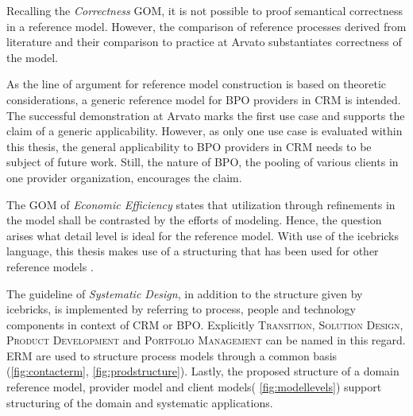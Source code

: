 	Recalling the \textit{Correctness} \acrshort{GOM}, it is not possible to proof semantical correctness in a reference model. However, the comparison of reference processes derived from literature and their comparison to practice at Arvato substantiates correctness of the model. 
	
As the line of argument for reference model construction is based on theoretic considerations, a generic reference model for BPO providers in CRM is intended. The successful demonstration at Arvato marks the first use case and supports the claim of a generic applicability. However, as only one use case is evaluated within this thesis, the general applicability to BPO providers in CRM needs to be subject of future work. Still, the nature of BPO, \ie the pooling of various clients in one provider organization, encourages the claim. 

The \acrshort{GOM} of \textit{Economic Efficiency} states that utilization through refinements in the model shall be contrasted by the efforts of modeling. Hence, the question arises what detail level is ideal for the reference model. With use of the icebricks language, this thesis makes use of a structuring that has been used for other reference models \citep{Puster2015, 9783832540920}. 

The guideline of \textit{Systematic Design}, in addition to the structure given by icebricks, is implemented by referring to process, people and technology components in context of CRM or BPO. Explicitly \textsc{Transition}, \textsc{Solution Design}, \textsc{Product Development}  and \textsc{Portfolio Management} can be named in this regard. \acrshort{ERM} are used to structure process models through a common basis (\cf \Fig \ref{fig:contacterm}, \Fig \ref{fig:prodstructure}). Lastly, the proposed structure of a domain reference model, provider model and client models( \cf \Fig \ref{fig:modellevels}) support structuring of the domain and systematic applications. 


